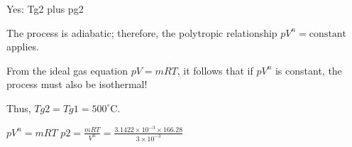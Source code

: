 Yes: Tg2 plus pg2  

The process is adiabatic; therefore, the polytropic relationship \( pV^n = \text{constant} \) applies.  

From the ideal gas equation \( pV = mRT \), it follows that if \( pV^n \) is constant, the process must also be isothermal!  

Thus, \( Tg2 = Tg1 = 500^\circ \text{C} \).  

\( pV^n = mRT \)  
\( p2 = \frac{mRT}{V^n} = \frac{3.1422 \times 10^{-3} \times 166.28}{3 \times 10^{-3}} \)